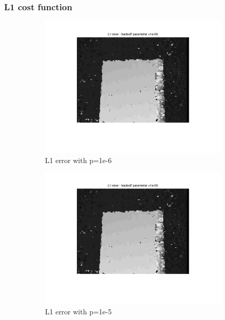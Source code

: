 \documentclass[fleqn]{article}
\begin{document}
\subsubsection{L1 cost function}
\begin{figure}[!ht]
 \begin{subfigure}{0.5\textwidth}
 \centering
\includegraphics[scale=0.2]{./pics/map_L1_error_p=1e-06.jpg}
\caption{L1 error with p=1e-6}
\end{subfigure}
 \begin{subfigure}{0.5\textwidth}
 \includegraphics[scale=0.2]{./pics/map_L1_error_p=1e-05.jpg}
 \caption{L1 error with p=1e-5}
\end{subfigure}
 \begin{subfigure}{0.5\textwidth}

\end{subfigure}
\end{figure}
\end{document}
